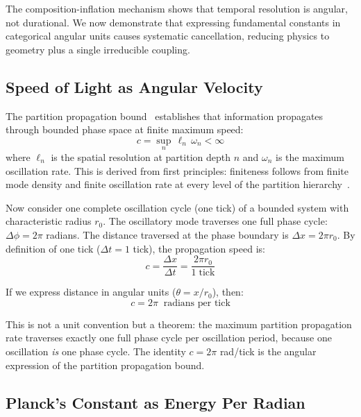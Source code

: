 \documentclass[twocolumn,10pt,a4paper]{article}
\theoremstyle{definition}
\theoremstyle{remark}
\begin{document}
The composition-inflation mechanism shows that temporal resolution is angular, not durational. We now demonstrate that expressing fundamental constants in categorical angular units causes systematic cancellation, reducing physics to geometry plus a single irreducible coupling.

\subsection{Speed of Light as Angular Velocity}

The partition propagation bound~\cite{sachikonye2025ion} establishes that information propagates through bounded phase space at finite maximum speed:
\begin{equation}
c = \sup_n \, \ell_n \, \omega_n < \infty
\label{eq:c_partition}
\end{equation}
where $\ell_n$ is the spatial resolution at partition depth $n$ and $\omega_n$ is the maximum oscillation rate. This is derived from first principles: finiteness follows from finite mode density and finite oscillation rate at every level of the partition hierarchy~\cite{sachikonye2025ion}.

Now consider one complete oscillation cycle (one tick) of a bounded system with characteristic radius $r_0$. The oscillatory mode traverses one full phase cycle: $\Delta\phi = 2\pi$ radians. The distance traversed at the phase boundary is $\Delta x = 2\pi r_0$. By definition of one tick ($\Delta t = 1$ tick), the propagation speed is:
\begin{equation}
c = \frac{\Delta x}{\Delta t} = \frac{2\pi r_0}{1\;\text{tick}}
\label{eq:c_angular_distance}
\end{equation}

If we express distance in angular units ($\theta = x / r_0$), then:
\begin{equation}
\boxed{c = 2\pi \;\;\text{radians per tick}}
\label{eq:c_angular}
\end{equation}

This is not a unit convention but a theorem: the maximum partition propagation rate traverses exactly one full phase cycle per oscillation period, because one oscillation \emph{is} one phase cycle. The identity $c = 2\pi$ rad/tick is the angular expression of the partition propagation bound.

\subsection{Planck's Constant as Energy Per Radian}
\end{document}
